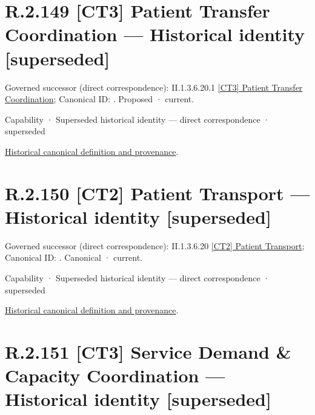 \section*{R.2.149 [CT3] Patient Transfer Coordination — Historical identity [superseded]}
\label{navigation:R.2.149}

{\small Governed successor (direct correspondence): II.1.3.6.20.1 \hyperref[element:c7c7aa8e34df4568ae4b91cdde380a11]{[CT3] Patient Transfer Coordination}; Canonical ID: \texttt{}. Proposed · current.}\par
\label{element:b5a76d4877424b2ea9b01fb5fa22772c}
{\small Capability · Superseded historical identity — direct correspondence · superseded}\par
\href{../../../../../../../continuum/strategy/capability/b5a76d4877424b2ea9b01fb5fa22772c.md}{Historical canonical definition and provenance}.\par
\section*{R.2.150 [CT2] Patient Transport — Historical identity [superseded]}
\label{navigation:R.2.150}

{\small Governed successor (direct correspondence): II.1.3.6.20 \hyperref[element:6041d7c0cc5d4519aaea584bb4e6d365]{[CT2] Patient Transport}; Canonical ID: \texttt{}. Canonical · current.}\par
\label{element:e9c1a897884f4d758f5654b824364030}
{\small Capability · Superseded historical identity — direct correspondence · superseded}\par
\href{../../../../../../../continuum/strategy/capability/e9c1a897884f4d758f5654b824364030.md}{Historical canonical definition and provenance}.\par
\section*{R.2.151 [CT3] Service Demand \& Capacity Coordination — Historical identity [superseded]}
\label{navigation:R.2.151}

